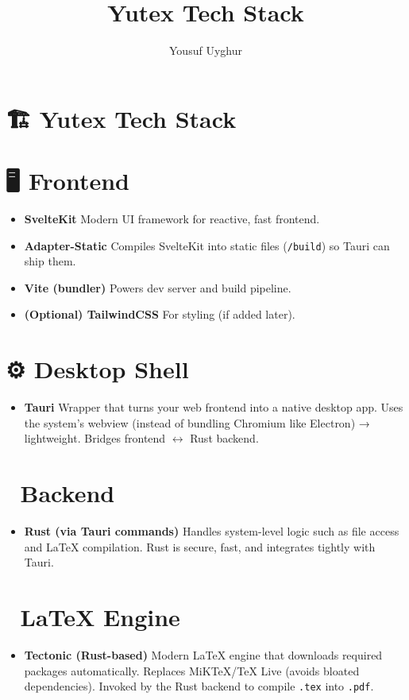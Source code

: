 \documentclass[12pt,a4paper]{article}
\title{Yutex Tech Stack}
\author{Yousuf Uyghur}
\date{}
\begin{document}
\maketitle

\section*{🏗️ Yutex Tech Stack}

\section*{🖥️ Frontend}
\begin{itemize}
    \item \textbf{SvelteKit}  
    Modern UI framework for reactive, fast frontend.
    \item \textbf{Adapter-Static}  
    Compiles SvelteKit into static files (\texttt{/build}) so Tauri can ship them.
    \item \textbf{Vite (bundler)}  
    Powers dev server and build pipeline.
    \item \textbf{(Optional) TailwindCSS}  
    For styling (if added later).
\end{itemize}

\section*{⚙️ Desktop Shell}
\begin{itemize}
    \item \textbf{Tauri}  
    Wrapper that turns your web frontend into a native desktop app.  
    Uses the system’s webview (instead of bundling Chromium like Electron) → lightweight.  
    Bridges frontend $\leftrightarrow$ Rust backend.
\end{itemize}

\section*{🦀 Backend}
\begin{itemize}
    \item \textbf{Rust (via Tauri commands)}  
    Handles system-level logic such as file access and LaTeX compilation.  
    Rust is secure, fast, and integrates tightly with Tauri.
\end{itemize}

\section*{📄 LaTeX Engine}
\begin{itemize}
    \item \textbf{Tectonic (Rust-based)}  
    Modern LaTeX engine that downloads required packages automatically.  
    Replaces MiKTeX/TeX Live (avoids bloated dependencies).  
    Invoked by the Rust backend to compile \texttt{.tex} into \texttt{.pdf}.
\end{itemize}
\end{document}

